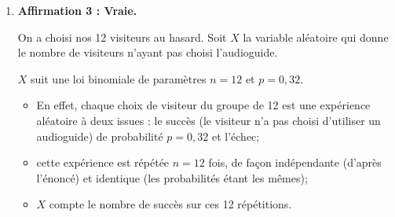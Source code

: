 \begin{enumerate}
	$L$ et $\overline{L}$ formant une partition de l'univers, d'après la loi des probabilités totales, on a :

	$P\big(\, \overline{A}\, \big) = P\big(\, L \cap \overline{A}\, \big) + P\big(\, \overline{L} \cap \overline{A}\, \big)$.

	D'après notre arbre :\quad $P\big(\, L \cap \overline{A} \, \big) = P\big(\, L \,\big) \times P_{\overline{A}}\big(\,L\,\big) = 0,7 \times 0,2 = 0,14$.

	On a donc :\quad $\begin{aligned}[t]
		P\big(\, \overline{A}\, \big) = P\big(\, L \cap \overline{A}\, \big) + P\big(\, \overline{L} \cap \overline{A}\, \big)
		&\iff 0,32 = 0,14 + P\big(\, \overline{L} \cap \overline{A}\, \big)\\
		&\iff P\big(\, \overline{L} \cap \overline{A}\, \big) = 0,32 - 0,14\\
		&\iff P\big(\, \overline{L} \cap \overline{A}\, \big) = 0,18\\
	\end{aligned}$.

	On calcule finalement :\quad $P_{\overline{L}}\big(\,\overline{A}\,\big) = \dfrac{P\big(\,\overline{L} \cap \overline{A}\,\big)}{P\big(\,\overline{L} \,\big) } = \dfrac{0,18}{0,3} = 0,6 < \dfrac{2}{3}$.

	La probabilité qu'un visiteur ne prenne pas l'audioguide sachant qu'il a acheté son billet au guichet est de 0,6, qui est strictement inférieur à deux tiers.

	\item \textbf{Affirmation 3 : Vraie.}

	On a choisi nos 12 visiteurs au hasard. Soit $X$ la variable aléatoire qui donne le nombre de visiteurs n'ayant pas choisi l'audioguide.

	$X$ suit une loi binomiale de paramètres $n=12$ et $p = 0,32$.

	\begin{itemize}
		\item En effet, chaque choix de visiteur du groupe de 12 est une expérience aléatoire à deux issues : le succès (le visiteur n'a pas choisi d'utiliser un audioguide) de probabilité $p = 0,32$ et l'échec;
		\item cette expérience est répétée $n = 12$ fois, de façon indépendante (d'après l'énoncé) et identique (les probabilités étant les mêmes);
		\item $X$ compte le nombre de succès sur ces 12 répétitions.
	\end{itemize}


\end{enumerate}
